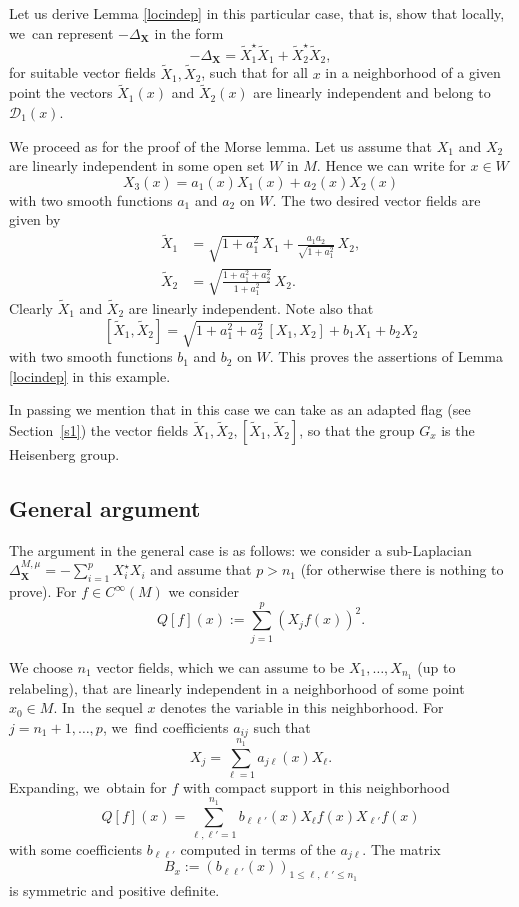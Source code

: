 \documentclass[JEP,XML,SOM,Unicode,published]{cedram}
\newcommand{\bX}{{\boldsymbol{X}}}
\theoremstyle{definition}
\let\Xb\bX
\newcommand{\1}{\mathbbm{1}}
\begin{document}
Let us derive Lemma \ref{locindep} in this particular case, that is, show that locally, we~can represent $-\Delta_\Xb$ in the form
\[
- \Delta_\Xb = \tilde X_1^\star \tilde X_1 + \tilde X_2^\star \tilde X_2,
\]
for suitable vector fields $\tilde X_1,\tilde X_2$, such that for all $x$ in a neighborhood of a given point the vectors $\tilde X_1(x)$ and $\tilde X_2(x)$ are linearly independent and belong to $\mathcal D_1(x)$.

We proceed as for the proof of the Morse lemma. Let us assume that $X_1$ and $X_2$ are linearly independent in some open set $W$ in $M$. Hence we can write for $x\in W$
\[
X_3(x) = a_1(x) X_1(x) + a_2(x) X_2(x)
\]
with two smooth functions $a_1$ and $a_2$ on $W$. The two desired vector fields are given by
\begin{equation}
\begin{array}{ll}
\tilde X_1 &= \sqrt{1+a_1^2} \,X_1 + \frac{a_1 a_2}{\sqrt{1+ a_1^2}} \,X_2, \\
\tilde X_2 &= \sqrt{\frac{1+ a_1^2 + a_2^2}{1+a_1^2}} \,X_2.
\end{array}
\end{equation}
Clearly $\tilde X_1$ and $\tilde X_2$ are linearly independent. Note also that
\[
[\tilde X_1,\tilde X_2] = \sqrt{1+a_1^2 +a_2^2}\,[X_1,X_2] + b_1 X_1 + b_2 X_2
\]
with two smooth functions $b_1$ and $b_2$ on $W$. This proves the assertions of Lemma \ref{locindep} in this example.

In passing we mention that in this case we can take as an adapted flag (see Section~\ref{s1}) the vector fields $\tilde X_1, \tilde X_2, [\tilde X_1,\tilde X_2] $, so that the group $G_x$ is the Heisenberg group.

\subsection{General argument}
The argument in the general case is as follows: we consider a sub-Laplacian $\Delta_\Xb^{M,\mu} =-\sum_{i=1}^p X_i^\star X_i$ and assume that $p>n_1$ (for otherwise there is nothing to prove). For $f\in C^\infty(M)$ we consider
\[
Q[f](x) := \sum_{j=1}^p (X_j f (x))^2.
\]

We choose $n_1$ vector fields, which we can assume to be $X_1,\ldots,X_{n_1}$ (up to relabeling), that are linearly independent in a neighborhood of some point $x_0\in M$. In~the sequel $x$ denotes the variable in this neighborhood. For $j=n_1+1,\ldots,p$, we~find coefficients $a_{ij}$ such that
\[
X_j=\sum_{\ell=1}^{n_1} a_{j\ell}(x)X_\ell.
\]
Expanding, we~obtain for $f$ with compact support in this neighborhood
\[
Q[f](x)=\sum_{\ell, \ell'=1}^{n_1} b_{\ell \ell'}(x)X_\ell f(x) X_{\ell'}f(x)
\]
with some coefficients $b_{\ell \ell'}$ computed in terms of the $a_{j\ell}$. The matrix
\[
B_x :=(b_{\ell \ell'}(x))_{1\leq \ell,\ell'\leq n_1}
\]
is symmetric and positive definite.
\end{document}
